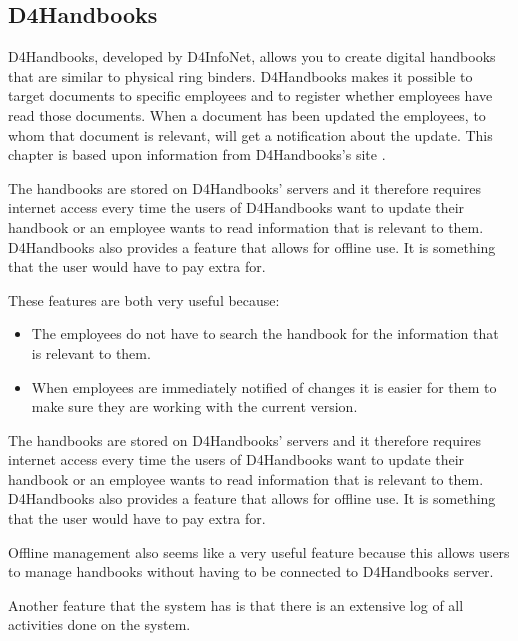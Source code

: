 \subsection{D4Handbooks}
D4Handbooks, developed by D4InfoNet, allows you to create digital handbooks that are similar to physical ring binders.
D4Handbooks makes it possible to target documents to specific employees and to register whether employees have read those documents.
When a document has been updated the employees, to whom that document is relevant, will get a notification about the update.
This chapter is based upon information from D4Handbooks's site \cite{D4Hanbook}.

The handbooks are stored on D4Handbooks' servers and it therefore requires internet access every time the users of D4Handbooks want to update their handbook or an employee wants to read information that is relevant to them.
D4Handbooks also provides a feature that allows for offline use. It is something that the user would have to pay extra for.

These features are both very useful because:

\begin{itemize}
        \item
        The employees do not have to search the handbook for the information that is relevant to them.
        \item
        When employees are immediately notified of changes it is easier for them to make sure they are working with the current version.
\end{itemize}

The handbooks are stored on D4Handbooks' servers and it therefore requires internet access every time the users of D4Handbooks want to update their handbook or an employee wants to read information that is relevant to them.
D4Handbooks also provides a feature that allows for offline use. It is something that the user would have to pay extra for.

Offline management also seems like a very useful feature because this allows users to manage handbooks without having to be connected to D4Handbooks server.

Another feature that the system has is that there is an extensive log of all activities done on the system.
